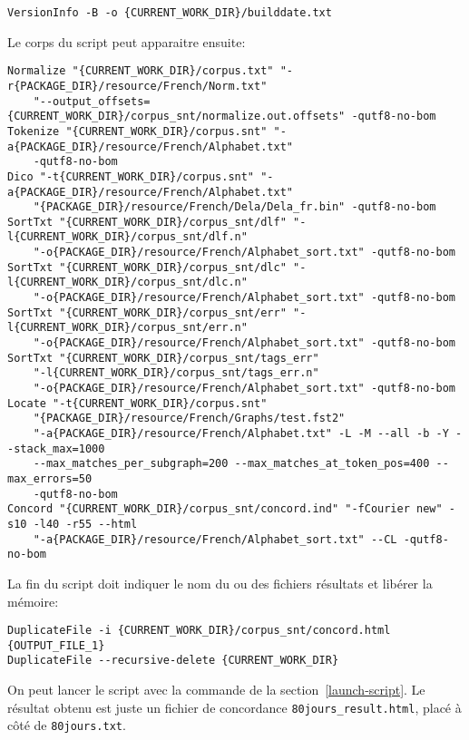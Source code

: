 \begin{Verbatim}[fontsize=\small,fontfamily=helvetica]
VersionInfo -B -o {CURRENT_WORK_DIR}/builddate.txt
\end{Verbatim}

\noindent Le corps du script peut apparaitre ensuite:

\begin{Verbatim}[fontsize=\small,fontfamily=helvetica]
Normalize "{CURRENT_WORK_DIR}/corpus.txt" "-r{PACKAGE_DIR}/resource/French/Norm.txt" 
    "--output_offsets={CURRENT_WORK_DIR}/corpus_snt/normalize.out.offsets" -qutf8-no-bom
Tokenize "{CURRENT_WORK_DIR}/corpus.snt" "-a{PACKAGE_DIR}/resource/French/Alphabet.txt"
    -qutf8-no-bom
Dico "-t{CURRENT_WORK_DIR}/corpus.snt" "-a{PACKAGE_DIR}/resource/French/Alphabet.txt" 
    "{PACKAGE_DIR}/resource/French/Dela/Dela_fr.bin" -qutf8-no-bom
SortTxt "{CURRENT_WORK_DIR}/corpus_snt/dlf" "-l{CURRENT_WORK_DIR}/corpus_snt/dlf.n" 
    "-o{PACKAGE_DIR}/resource/French/Alphabet_sort.txt" -qutf8-no-bom
SortTxt "{CURRENT_WORK_DIR}/corpus_snt/dlc" "-l{CURRENT_WORK_DIR}/corpus_snt/dlc.n" 
    "-o{PACKAGE_DIR}/resource/French/Alphabet_sort.txt" -qutf8-no-bom
SortTxt "{CURRENT_WORK_DIR}/corpus_snt/err" "-l{CURRENT_WORK_DIR}/corpus_snt/err.n" 
    "-o{PACKAGE_DIR}/resource/French/Alphabet_sort.txt" -qutf8-no-bom
SortTxt "{CURRENT_WORK_DIR}/corpus_snt/tags_err"
    "-l{CURRENT_WORK_DIR}/corpus_snt/tags_err.n" 
    "-o{PACKAGE_DIR}/resource/French/Alphabet_sort.txt" -qutf8-no-bom
Locate "-t{CURRENT_WORK_DIR}/corpus.snt"
    "{PACKAGE_DIR}/resource/French/Graphs/test.fst2" 
    "-a{PACKAGE_DIR}/resource/French/Alphabet.txt" -L -M --all -b -Y --stack_max=1000
    --max_matches_per_subgraph=200 --max_matches_at_token_pos=400 --max_errors=50
    -qutf8-no-bom
Concord "{CURRENT_WORK_DIR}/corpus_snt/concord.ind" "-fCourier new" -s10 -l40 -r55 --html 
    "-a{PACKAGE_DIR}/resource/French/Alphabet_sort.txt" --CL -qutf8-no-bom
\end{Verbatim}

\noindent La fin du script doit indiquer le nom du ou des fichiers résultats et libérer la mémoire:

\begin{Verbatim}[fontsize=\small,fontfamily=helvetica]
DuplicateFile -i {CURRENT_WORK_DIR}/corpus_snt/concord.html {OUTPUT_FILE_1}
DuplicateFile --recursive-delete {CURRENT_WORK_DIR}
\end{Verbatim}

\noindent On peut lancer le script avec la commande de la section~\ref{launch-script}. Le résultat
obtenu est juste un fichier de concordance \verb$80jours_result.html$, placé à côté de
\verb$80jours.txt$.

